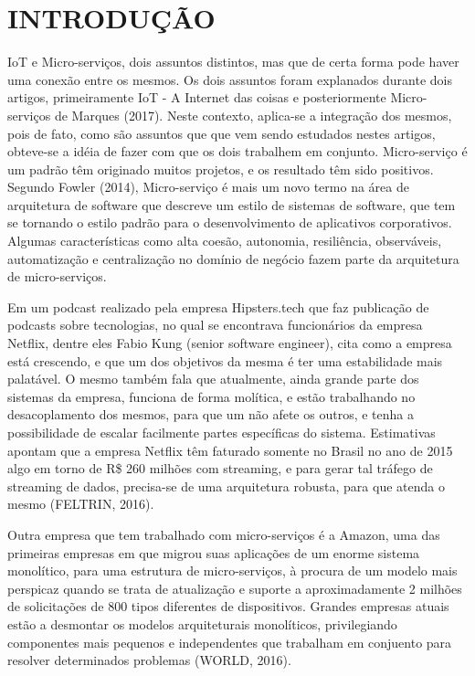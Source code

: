 \section{INTRODUÇÃO}

IoT e Micro-serviços, dois assuntos distintos, mas que de certa forma pode haver uma conexão entre os mesmos. Os dois assuntos foram explanados durante dois artigos, primeiramente IoT - A Internet das coisas e posteriormente Micro-serviços de Marques (2017). Neste contexto, aplica-se a integração dos mesmos, pois de fato, como são assuntos que que vem sendo estudados nestes artigos, obteve-se a idéia de fazer com que os dois trabalhem em conjunto. Micro-serviço é um padrão têm originado muitos projetos, e os resultado têm sido positivos. Segundo Fowler (2014), Micro-serviço é mais um novo termo na área de arquitetura de software que descreve um estilo de sistemas de software, que tem se tornando o estilo padrão para o desenvolvimento de aplicativos corporativos. Algumas características como alta coesão, autonomia, resiliência, observáveis, automatização e centralização no domínio de negócio fazem parte da arquitetura de micro-serviços. 

Em um podcast realizado pela empresa Hipsters.tech que faz publicação de podcasts sobre tecnologias, no qual se encontrava funcionários da empresa Netflix, dentre eles Fabio Kung (senior software engineer), cita como a empresa está crescendo, e que um dos objetivos da mesma é ter uma estabilidade mais palatável. O mesmo também fala que atualmente, ainda grande parte dos sistemas da empresa, funciona de forma molítica, e estão trabalhando no desacoplamento dos mesmos, para que um não afete os outros, e tenha a possibilidade de escalar facilmente partes específicas do sistema. Estimativas apontam que a empresa Netflix têm faturado somente no Brasil no ano de 2015 algo em torno de R\$ 260 milhões com streaming, e para gerar tal tráfego de streaming de dados, precisa-se de uma arquitetura robusta, para que atenda o mesmo (FELTRIN, 2016).

Outra empresa que tem trabalhado com micro-serviços é a Amazon, uma das primeiras empresas em que migrou suas aplicações de um enorme sistema monolítico, para uma estrutura de micro-serviços, à procura de um modelo mais perspicaz quando se trata de atualização e suporte a aproximadamente 2 milhões de solicitações de 800 tipos diferentes de dispositivos. Grandes empresas atuais estão a desmontar os modelos arquiteturais monolíticos, privilegiando componentes mais pequenos e independentes que trabalham em conjuento para resolver determinados problemas (WORLD, 2016).

